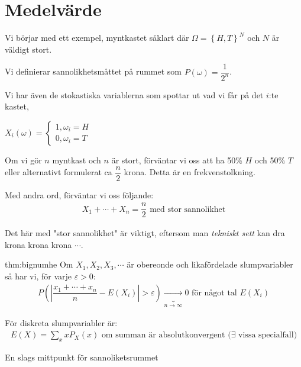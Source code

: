 \section{Medelvärde}\par
\noindent Vi börjar med ett exempel, myntkastet såklart där $\Omega = \left\{H,T\right\}^N$ och $N$ är väldigt stort.\par
\noindent Vi definierar sannolikhetsmåttet på rummet som $P(\omega) = \dfrac{1}{2^n}$.\par
\noindent Vi har även de stokastiska variablerna som spottar ut vad vi får på det $i$:te kastet,\par
\noindent $X_i(\omega) = \begin{cases}1, \omega_i = H\\0, \omega_i = T\end{cases}$
\par\bigskip
\noindent Om vi gör $n$ myntkast och $n$ är stort, förväntar vi oss att ha 50\% $H$ och 50\%  $T$ eller alternativt formulerat ca $\dfrac{n}{2}$ krona. Detta är en frekvenstolkning.
\par\bigskip
\noindent Med andra ord, förväntar vi oss följande:
\begin{equation*}
  \begin{gathered}
    X_1+\cdots+X_n =\dfrac{n}{2} \text{ med stor sannolikhet}
  \end{gathered}
\end{equation*}
\par\bigskip
\noindent Det här med "stor sannolikhet" är viktigt, eftersom man \textit{tekniskt sett} kan dra krona krona krona $\cdots$.
\par\bigskip
\begin{theo}{thm:bignumhe}
  Om $X_1,X_2,X_3,\cdots$ är obereonde och likafördelade slumpvariabler så har vi, för varje $\varepsilon>0$:
  \begin{equation*}
    \begin{gathered}
      P\left(\left|\dfrac{x_1+\cdots+x_n}{n}-E(X_i)\right|>\varepsilon\right)\underbrace{\to}_{\text{$n\to\infty$}} 0\text{ för något tal $E(X_i)$}
    \end{gathered}
  \end{equation*}
  \par\bigskip
  \noindent För diskreta slumpvariabler är:
  \begin{equation*}
    \begin{gathered}
      E(X) = \sum_{x}xP_X(x)\text{ om summan är absolutkonvergent ($\exists$ vissa specialfall)}
    \end{gathered}
  \end{equation*}
  \par\bigskip
  \noindent En slags mittpunkt för sannoliketsrummet
\end{theo}
